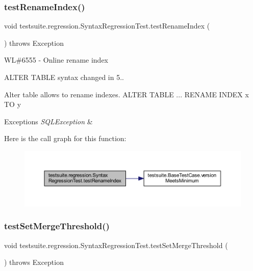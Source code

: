 \subsubsection{\texorpdfstring{test\+Rename\+Index()}{testRenameIndex()}}
{\footnotesize\ttfamily void testsuite.\+regression.\+Syntax\+Regression\+Test.\+test\+Rename\+Index (\begin{DoxyParamCaption}{ }\end{DoxyParamCaption}) throws Exception}

WL\#6555 -\/ Online rename index

A\+L\+T\+ER T\+A\+B\+LE syntax changed in 5..

Alter table allows to rename indexes. A\+L\+T\+ER T\+A\+B\+LE ... R\+E\+N\+A\+ME I\+N\+D\+EX x TO y


\begin{DoxyExceptions}{Exceptions}
{\em S\+Q\+L\+Exception} & \\
\hline
\end{DoxyExceptions}
Here is the call graph for this function\+:
\nopagebreak
\begin{figure}[H]
\begin{center}
\leavevmode
\includegraphics[width=350pt]{classtestsuite_1_1regression_1_1_syntax_regression_test_ab5d200050de3d77c76405bdda78d95a6_cgraph}
\end{center}
\end{figure}
\mbox{\label{classtestsuite_1_1regression_1_1_syntax_regression_test_a2a908e2479002b77f56fe61e6f25b244}} 
\subsubsection{\texorpdfstring{test\+Set\+Merge\+Threshold()}{testSetMergeThreshold()}}
{\footnotesize\ttfamily void testsuite.\+regression.\+Syntax\+Regression\+Test.\+test\+Set\+Merge\+Threshold (\begin{DoxyParamCaption}{ }\end{DoxyParamCaption}) throws Exception}

